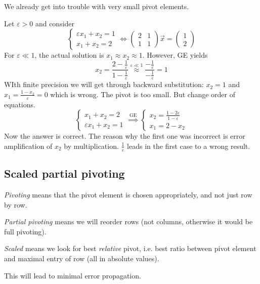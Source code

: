 We already get into trouble with
very small pivot elements.
\begin{example}
    Let $\varepsilon > 0$ and consider
    \[
        \begin{cases}
            \varepsilon x_1 + x_2 = 1\\
            x_1 + x_2 = 2
        \end{cases}
        \Longleftrightarrow
        \begin{pmatrix}
            2 & 1\\
            1 & 1
        \end{pmatrix}
        \vec{x} = \begin{pmatrix}
            1 \\ 2
        \end{pmatrix}
    \]
    For $\varepsilon \ll 1$, the actual solution is $x_1 \approx x_2 \approx 1$.
    However, GE yields
    \[
        x_2 = \frac{2 - \frac{1}{\varepsilon}}{1 - \frac{1}{\varepsilon}}
        \overset{\varepsilon \ll 1}{\approx}
        \frac{-\frac{1}{\varepsilon}}{-\frac{1}{\varepsilon}} = 1
    \] 
    WIth finite precision we will get through backward substitution:
    $x_2 = 1$ and $x_1 = \frac{1 - x_2}{\varepsilon} = 0$ which is wrong.
    The pivot is too small. But change order of equations.
    \[
        \begin{cases}
            x_1 + x_2 = 2\\
            \varepsilon x_1 + x_2 = 1
        \end{cases}
        \overset{\text{GE}}{\implies}
        \begin{cases}
            x_2 = \frac{1 - 2\varepsilon}{1 - \varepsilon}\\
            x_1 = 2 - x_2
        \end{cases}
    \]
    Now the answer is correct. The reason why the first one was incorrect is
    error amplification of $x_2$ by multiplication.
    $\frac{1}{\varepsilon}$ leads in the first case to a wrong result.
\end{example}

\subsection{Scaled partial pivoting}
\begin{definition}
    \textit{Pivoting} means that the pivot element is chosen 
    appropriately, and not just row by row.
\end{definition}
\begin{definition}
    \textit{Partial pivoting} means we will reorder rows
    (not columns, otherwise it would be full pivoting).
\end{definition}
\begin{definition}
    \textit{Scaled} means we look for best \textit{relative} pivot,
    i.e. best ratio between pivot element and maximal entry of row
    (all in absolute values).
\end{definition}
\begin{remark}
    This will lead to minimal error propagation.
\end{remark}

